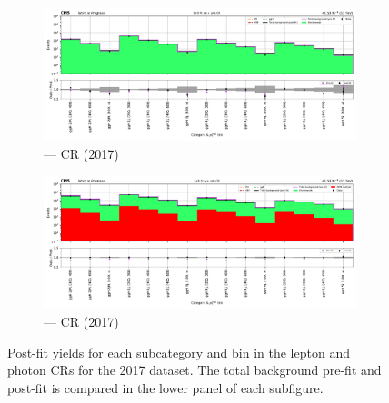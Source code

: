 \begin{figure}[htbp]
    \begin{subfigure}[b]{0.66\textwidth}
        \includegraphics[width=\textwidth]{chapters/higgstoinv/figures/mountain_ranges/2017/ggF/Zee_tree_fit_s-abs_values_ggF_cats.pdf}
        \caption{\ggH --- \doubleEleCr \gls{CR} (2017)}
    \end{subfigure}

    \begin{subfigure}[b]{0.66\textwidth}
        \includegraphics[width=\textwidth]{chapters/higgstoinv/figures/mountain_ranges/2017/ggF/Photon_tree_fit_s-abs_values_ggF_cats.pdf}
        \caption{\ggH --- \singlePhotonCr \gls{CR} (2017)}
    \end{subfigure}
    \caption[Post-fit yields for each \ggH subcategory and \ptmiss bin in the lepton and photon control regions for the 2017 dataset]{Post-fit yields for each \ggH subcategory and \ptmiss bin in the lepton and photon \glspl{CR} for the 2017 dataset. The total background pre-fit and post-fit is compared in the lower panel of each subfigure.}
    \label{fig:htoinv_mountain_range_ggF_2017_CRs}
\end{figure}

